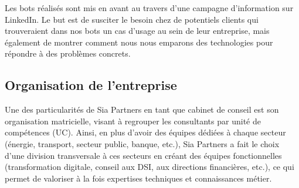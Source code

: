 \documentclass{article} %
\begin{document}
Les bots réalisés sont mis en avant au travers d'une campagne d’information sur LinkedIn. Le but est de susciter le besoin chez de potentiels clients qui trouveraient dans nos bots un cas d’usage au sein de leur entreprise, mais également de montrer comment nous nous emparons des technologies pour répondre à des problèmes concrets.

\subsection{Organisation de l'entreprise}
Une des particularités de Sia Partners en tant que cabinet de conseil est son organisation matricielle, visant à regrouper les consultants par unité de compétences (UC). Ainsi, en plus d’avoir des équipes dédiées à chaque secteur (énergie, transport, secteur public, banque, etc.), Sia Partners a fait le choix d’une division transversale à ces secteurs en créant des équipes fonctionnelles (transformation digitale, conseil aux DSI, aux directions financières, etc.), ce qui permet de valoriser à la fois expertises techniques et connaissances métier. \\
\end{document}
